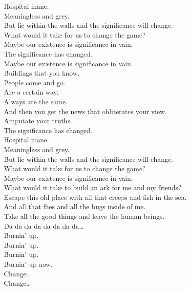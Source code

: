 Hospital inane. \\
Meaningless and grey. \\
But lie within the walls and the significance will change. \\
What would it take for us to change the game? \\
Maybe our existence is significance in vain. \\
The significance has changed. \\
Maybe our existence is significance in vain. \\

Buildings that you know. \\
People come and go. \\
Are a certain way. \\
Always are the same. \\
And then you get the news that obliterates your view. \\
Amputate your truths. \\
The significance has changed. \\

Hospital inane. \\
Meaningless and grey. \\
But lie within the walls and the significance will change. \\
What would it take for us to change the game? \\
Maybe our existence is significance in vain. \\

What would it take to build an ark for me and my friends? \\
Escape this old place with all that creeps and fish in the sea. \\
And all that flies and all the bugs inside of me. \\
Take all the good things and leave the human beings. \\

Da da da da da da da da… \\

Burnin' up. \\
Burnin' up. \\
Burnin' up. \\
Burnin' up now. \\

Change. \\
Change… \\


